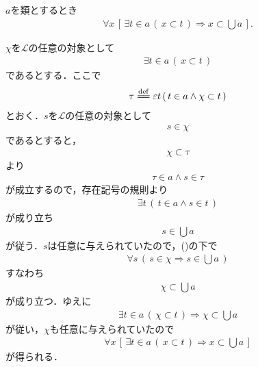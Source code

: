 	\begin{screen}
		\begin{thm}[要素の部分集合は合併の部分集合]\label{thm:union_is_bigger_than_any_member}
			$a$を類とするとき
			\begin{align}
				\forall x\, \left[\, \exists t \in a\, (\, x \subset t\, ) \Longrightarrow x \subset \bigcup a\, \right].
			\end{align}
		\end{thm}
	\end{screen}
	
	\begin{sketch}
		$\chi$を$\mathcal{L}$の任意の対象として
		\begin{align}
			\exists t \in a\, (\, x \subset t\, )
			\label{fom:thm_union_is_bigger_than_any_member_1}
		\end{align}
		であるとする．ここで
		\begin{align}
			\tau \defeq \varepsilon t\, (\, t \in a \wedge \chi \subset t\, )
		\end{align}
		とおく．$s$を$\mathcal{L}$の任意の対象として
		\begin{align}
			s \in \chi
		\end{align}
		であるとすると，
		\begin{align}
			\chi \subset \tau
		\end{align}
		より
		\begin{align}
			\tau \in a \wedge s \in \tau
		\end{align}
		が成立するので，存在記号の規則より
		\begin{align}
			\exists t\, \left(\, t \in a \wedge s \in t\, \right)
		\end{align}
		が成り立ち
		\begin{align}
			s \in \bigcup a
		\end{align}
		が従う．$s$は任意に与えられていたので，()の下で
		\begin{align}
			\forall s\, (\, s \in \chi \Longrightarrow s \in \bigcup a\, )
		\end{align}
		すなわち
		\begin{align}
			\chi \subset \bigcup a
		\end{align}
		が成り立つ．ゆえに
		\begin{align}
			\exists t \in a\, \left(\, \chi \subset t\, \right) \Longrightarrow \chi \subset \bigcup a
		\end{align}
		が従い，$\chi$も任意に与えられていたので
		\begin{align}
			\forall x\, \left[\, \exists t \in a\, (\, x \subset t\, ) \Longrightarrow x \subset \bigcup a\, \right]
		\end{align}
		が得られる．
		\QED
	\end{sketch}
	

